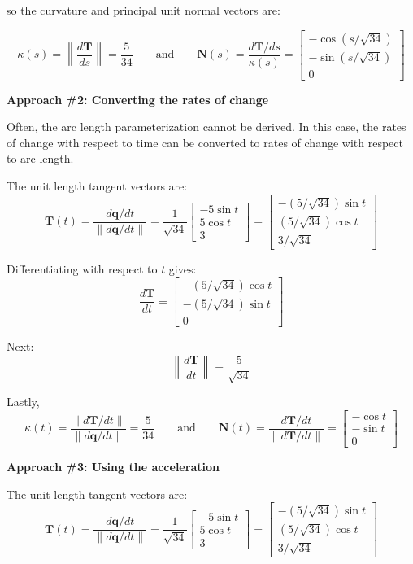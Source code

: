 \documentclass{article}
\begin{document}
so the curvature and principal unit normal vectors are:

\[\kappa(s) = \left\|\frac{d\mathbf{T}}{ds}\right\| = \frac{5}{34}
\quad\quad\text{and}\quad\quad
\mathbf{N}(s) = \frac{d\mathbf{T}/ds}{\kappa(s)} = \begin{bmatrix} -\cos(s/\sqrt{34}) \\ -\sin(s/\sqrt{34}) \\ 0 \end{bmatrix}\]


\textbf{Approach \#2: Converting the rates of change}

Often, the arc length parameterization cannot be derived. In this case, the rates of change with respect to time can be converted to rates of change with respect to arc length. 

The unit length tangent vectors are: 
\[\mathbf{T}(t) = \frac{d\mathbf{q}/dt}{\|d\mathbf{q}/dt\|} = \frac{1}{\sqrt{34}}\begin{bmatrix} -5 \sin t \\ 5 \cos t \\ 3 \end{bmatrix} = \begin{bmatrix} -(5/\sqrt{34})\sin t \\ (5/\sqrt{34})\cos t \\ 3/\sqrt{34} \end{bmatrix}\]  

Differentiating with respect to \(t\) gives:
\[\frac{d\mathbf{T}}{dt} = \begin{bmatrix} -(5/\sqrt{34})\cos t \\ -(5/\sqrt{34})\sin t \\ 0 \end{bmatrix}\]

Next:
\[\left\|\frac{d\mathbf{T}}{dt}\right\| = \frac{5}{\sqrt{34}}\]

Lastly,
\[\kappa(t) = \frac{\|d\mathbf{T}/dt\|}{\|d\mathbf{q}/dt\|} = \frac{5}{34}
\quad\quad\text{and}\quad\quad
\mathbf{N}(t) = \frac{d\mathbf{T}/dt}{\|d\mathbf{T}/dt\|} = \begin{bmatrix} -\cos t \\ -\sin t \\ 0 \end{bmatrix}\]


\textbf{Approach \#3: Using the acceleration}

The unit length tangent vectors are: 
\[\mathbf{T}(t) = \frac{d\mathbf{q}/dt}{\|d\mathbf{q}/dt\|} = \frac{1}{\sqrt{34}}\begin{bmatrix} -5 \sin t \\ 5 \cos t \\ 3 \end{bmatrix} = \begin{bmatrix} -(5/\sqrt{34})\sin t \\ (5/\sqrt{34})\cos t \\ 3/\sqrt{34} \end{bmatrix}\]  
\end{document}
